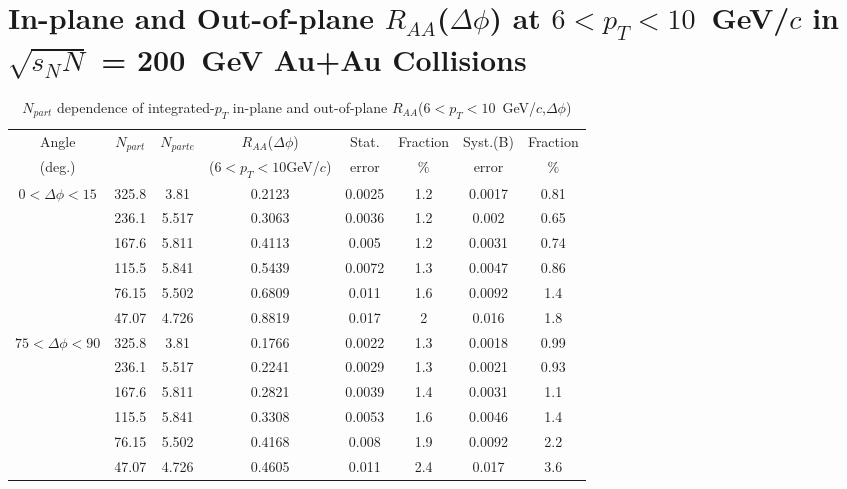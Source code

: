 \chapter{In-plane and Out-of-plane $R_{AA}$($\Delta\phi$) at $6<p_{T}<10$~GeV/$c$ in $\sqrt{s_NN}$ = 200~GeV Au+Au Collisions}
\begin{table}[!htb]
\centering
\begin{tabular}{cccccccc}
\hline
\hline
Angle & $N_{part}$ & $N_{parte}$ & $R_{AA}$($\Delta\phi$) & Stat. & Fraction & Syst.(B) & Fraction \\
(deg.) & & & ($6<p_{T}<10$GeV/$c$) & error & $\%$ & error & $\%$ \\
\hline
$0<\Delta\phi<15$ & 325.8 & 3.81 & 0.2123 & 0.0025 & 1.2 & 0.0017 & 0.81 \\ 
  & 236.1 & 5.517 & 0.3063 & 0.0036 & 1.2 & 0.002 & 0.65 \\ 
  & 167.6 & 5.811 & 0.4113 & 0.005 & 1.2 & 0.0031 & 0.74 \\ 
  & 115.5 & 5.841 & 0.5439 & 0.0072 & 1.3 & 0.0047 & 0.86 \\ 
  & 76.15 & 5.502 & 0.6809 & 0.011 & 1.6 & 0.0092 & 1.4 \\ 
  & 47.07 & 4.726 & 0.8819 & 0.017 & 2 & 0.016 & 1.8 \\ 
\hline
$75<\Delta\phi<90$ & 325.8 & 3.81 & 0.1766 & 0.0022 & 1.3 & 0.0018 & 0.99 \\ 
  & 236.1 & 5.517 & 0.2241 & 0.0029 & 1.3 & 0.0021 & 0.93 \\ 
  & 167.6 & 5.811 & 0.2821 & 0.0039 & 1.4 & 0.0031 & 1.1 \\ 
  & 115.5 & 5.841 & 0.3308 & 0.0053 & 1.6 & 0.0046 & 1.4 \\ 
  & 76.15 & 5.502 & 0.4168 & 0.008 & 1.9 & 0.0092 & 2.2 \\ 
  & 47.07 & 4.726 & 0.4605 & 0.011 & 2.4 & 0.017 & 3.6 \\ 
\hline
\hline
\end{tabular}
\caption{$N_{part}$ dependence of integrated-$p_{T}$ in-plane and out-of-plane $R_{AA}$($6<p_{T}<10$~GeV/$c$,$\Delta\phi$)}
\end{table}
            
            
